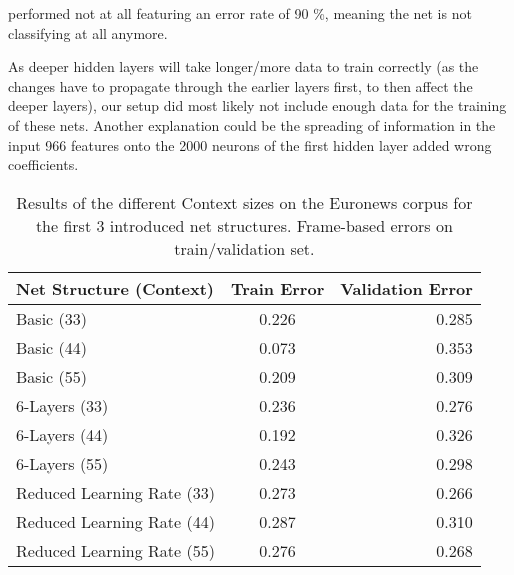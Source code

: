 performed not at all featuring an error rate of 90 \%, meaning the net is not classifying at all anymore. 

As deeper hidden layers will take longer/more data to train correctly (as the changes have to propagate through the earlier layers first, to then affect the deeper layers), our setup did most likely not include enough data for the training of these nets. Another explanation could be the spreading of information in the input 966 features onto the 2000 neurons of the first hidden layer added wrong coefficients.

\begin{table}[h!]
\label{tab:resCtx}
\centering
\begin{tabular}{| l | c | r | }
	\hline
	\textbf{Net Structure (Context)} & \textbf{Train Error} & \textbf{Validation Error}  \\
	\hline
	Basic (33) & 0.226 &  0.285 \\
	\hline
	Basic (44) & 0.073 & 0.353 \\
	\hline
	Basic (55) & 0.209 & 0.309 \\
	\hline
	6-Layers (33) & 0.236 & 0.276 \\
	\hline
	6-Layers (44) & 0.192 & 0.326 \\
	\hline
	6-Layers (55) & 0.243 & 0.298 \\
	\hline
	Reduced Learning Rate (33) & 0.273 & 0.266 \\ 
	\hline
	Reduced Learning Rate (44) & 0.287 & 0.310 \\ 
	\hline
	Reduced Learning Rate (55) & 0.276 & 0.268 \\ 
	\hline
\end{tabular}
\caption{Results of the different Context sizes on the Euronews corpus for the first 3 introduced net structures. Frame-based errors on train/validation set.}
\end{table}


